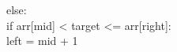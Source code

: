 \documentclass[preview]{standalone}
\begin{document}
else:\\if arr[mid] < target <= arr[right]:\\left = mid + 1\\
\end{document}
